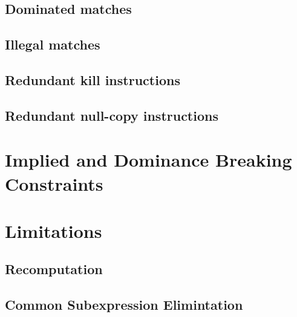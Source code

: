 \subsection{Dominated matches}
\subsection{Illegal matches}
\subsection{Redundant kill instructions}
\subsection{Redundant null-copy instructions}

\section{Implied and Dominance Breaking Constraints}

\section{Limitations}
\subsection{Recomputation}
\subsection{Common Subexpression Elimintation}

